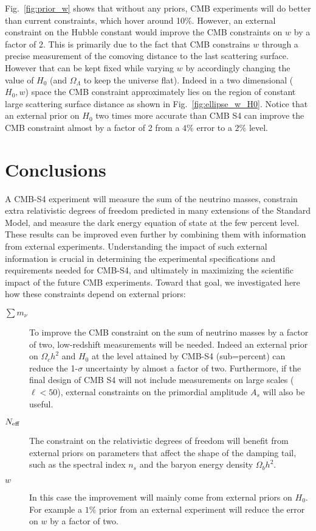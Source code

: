 \documentclass[aps,prd,reprint,superscriptaddress]{revtex4-1}
\newcommand{\reffig}[1]{Fig.~\ref{fig:#1}}
\begin{document}
\reffig{prior_w} shows that without any priors, CMB experiments will do better than current constraints, which hover around 10\%. However, an external constraint on the Hubble constant would improve the CMB constraints on $w$ by a factor of 2. 
This is primarily due to the fact that CMB constrains $w$ through a precise measurement of the comoving distance to the last scattering surface. However that can be kept fixed while varying $w$ by accordingly changing the value of $H_{0}$ (and $\Omega_{\Lambda}$ to keep the universe flat). Indeed in a two dimensional ($H_{0},w$) space the CMB constraint approximately lies on the region of constant large scattering surface distance as shown in \reffig{ellipse_w_H0}.
Notice that an external prior on $H_{0}$ two times more accurate than CMB S4 can improve the CMB constraint almost by a factor of 2 from a $4\%$ error to a $2\%$ level.

\section{Conclusions  \label{sec:conclusions}}
A CMB-S4 experiment will measure the sum of the neutrino masses, constrain extra relativistic degrees of freedom predicted in many extensions of the Standard Model, and measure the dark energy equation of state at the few percent level.  
These results can be improved even further by combining them with information from external experiments.
Understanding the impact of such external information is crucial in determining the experimental specifications and requirements needed for CMB-S4, and ultimately in maximizing the scientific impact of the future CMB experiments. 
Toward that goal, we investigated here how these constraints depend on external priors:
\begin{description}
\item[$\sum m_\nu$] To improve the CMB constraint on the sum of neutrino masses by a factor of two, low-redshift measurements will be needed. Indeed an external prior on $\Omega_{c}h^{2}$ and $H_{0}$ at the level attained by CMB-S4 (sub=percent) can reduce the 1-$\sigma$ uncertainty by almost a factor of two.
Furthermore, if the final design of CMB S4 will not include measurements on large scales ($\ell<50$), external constraints on the primordial amplitude $A_{s}$ will also be useful. %
\item[$N_{\rm eff}$] The constraint on the relativistic degrees of freedom will benefit from external priors on parameters that affect the shape of the damping tail, such as the spectral index $n_s$ and the baryon energy density $\Omega_b h^2$.
\item[$w$] In this case the improvement will mainly come from external priors on $H_{0}$. For example a $1\%$ prior from an external experiment will reduce the error on $w$ by a factor of two.\end{description}
\end{document}
